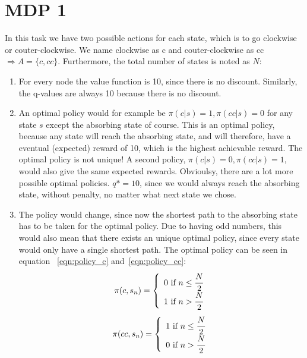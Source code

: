\section{MDP 1}
In this task we have two possible actions for each state, which is to go clockwise or couter-clockwise.
We name clockwise as c and couter-clockwise as cc $\Rightarrow A=\{c, cc\}$. Furthermore, the total number of
states is noted as $N$:
\begin{enumerate}
    \item For every node the value function is 10, since there is no discount. Similarly, the q-values are always 10 because there is no discount.
    \item An optimal policy would for example be $\pi(c|s)=1, \pi(cc|s)=0$ for any state $s$ except the absorbing state of course. This is an optimal policy,
    because any state will reach the absorbing state, and will therefore, have a eventual (expected) reward of 10, which is the highest achievable reward. The optimal
    policy is not unique! A second policy, $\pi(c|s)=0, \pi(cc|s)=1$, would also give the same expected rewards. Obvioulsy, there are a lot more possible
    optimal policies. $q*=10$, since we would always reach the absorbing state, without penalty, no matter what next state we chose.
    \item The policy would change, since now the shortest path to the absorbing state has to be taken for the optimal policy. Due to having odd numbers,
    this would also mean that there exists an unique optimal policy, since every state would only have a single shortest path. The optimal policy can be seen in equation
    ~\ref{eqn:policy_c} and~\ref{eqn:policy_cc}:
    \begin{equation}
        \pi(c, s_n)=\left\{
            \begin{array}{ll}
                0\mbox{ if }n\leq\cfrac{N}{2}\\
                1\mbox{ if }n>\cfrac{N}{2}
            \end{array}
        \right.
        \label{eqn:policy_c}
    \end{equation}
    \begin{equation}
        \pi(cc, s_n)=\left\{
            \begin{array}{ll}
                1\mbox{ if }n\leq\cfrac{N}{2}\\
                0\mbox{ if }n>\cfrac{N}{2}
            \end{array}
        \right.
        \label{eqn:policy_cc}
    \end{equation}

\end{enumerate}
